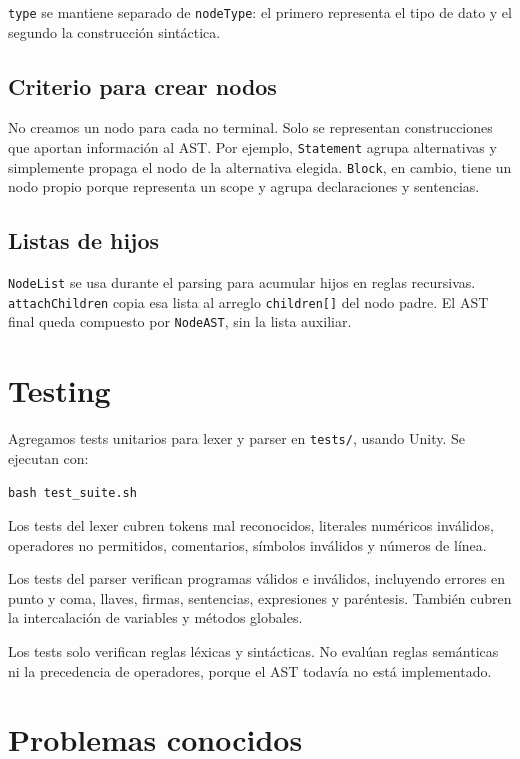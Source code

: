 \documentclass[11pt,a4paper]{article}
\begin{document}
\texttt{type} se mantiene separado de \texttt{nodeType}: el primero representa
el tipo de dato y el segundo la construcción sintáctica.

\subsection{Criterio para crear nodos}

No creamos un nodo para cada no terminal. Solo se representan construcciones
que aportan información al AST. Por ejemplo, \texttt{Statement} agrupa
alternativas y simplemente propaga el nodo de la alternativa elegida.
\texttt{Block}, en cambio, tiene un nodo propio porque representa un scope y
agrupa declaraciones y sentencias.

\subsection{Listas de hijos}

\texttt{NodeList} se usa durante el parsing para acumular hijos en reglas
recursivas. \texttt{attachChildren} copia esa lista al arreglo
\texttt{children[]} del nodo padre. El AST final queda compuesto por
\texttt{NodeAST}, sin la lista auxiliar.

\section{Testing}
\label{sec:tests}

Agregamos tests unitarios para lexer y parser en \texttt{tests/}, usando
Unity. Se ejecutan con:

\begin{verbatim}
bash test_suite.sh
\end{verbatim}

Los tests del lexer cubren tokens mal reconocidos, literales numéricos
inválidos, operadores no permitidos, comentarios, símbolos inválidos y
números de línea.

Los tests del parser verifican programas válidos e inválidos, incluyendo
errores en punto y coma, llaves, firmas, sentencias, expresiones y
paréntesis. También cubren la intercalación de variables y métodos globales.

Los tests solo verifican reglas léxicas y sintácticas. No evalúan reglas
semánticas ni la precedencia de operadores, porque el AST todavía no está
implementado.

\section{Problemas conocidos}
\label{sec:problemas}
\end{document}
